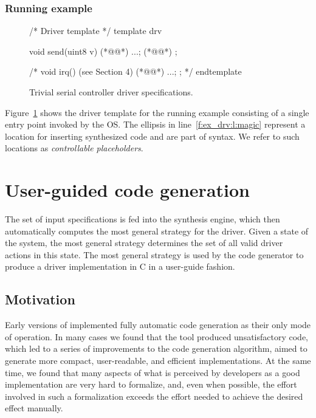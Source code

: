 \subsubsection{Running example}

\begin{figure}
\lstset{firstnumber=last}
\begin{tsllisting}[name=ex]
/* Driver template */
template drv 

    void send(uint8 v){ (*@\label{f:ex_drv:l:send}@*)
        ...; (*@\label{f:ex_drv:l:magic}@*)
    }; 

    /*
    void irq(){ (see Section 4) (*@\label{f:ex_drv:l:irq}@*)
        ...;
    }; 
    */
endtemplate
\end{tsllisting}
\caption{Trivial serial controller driver specifications.}
\label{f:ex_drv}
\end{figure}

Figure~\ref{f:ex_drv} shows the driver template for the running example consisting of a single  entry point invoked by the OS.  The ellipsis in line~\ref{f:ex_drv:l:magic} represent a location for inserting synthesized code and are part of \tsl syntax.  We refer to such locations as \emph{controllable placeholders}. 

\section{User-guided code generation}
\label{s:user-guided}

The set of input \tsl specifications is fed into the \termite synthesis engine, which then automatically computes the most general strategy for the driver.  Given a state of the system, the most general strategy determines the set of all valid driver actions in this state.  The most general strategy is used by the \termite code generator to produce a driver implementation in C in a user-guide fashion.

\subsection{Motivation}

Early versions of \termite implemented fully automatic code generation as their only mode of operation.  In many cases we found that the tool produced unsatisfactory code, which led to a series of improvements to the code generation algorithm, aimed to generate more compact, user-readable, and efficient implementations.  At the same time, we found that many aspects of what is perceived by developers as a good implementation are very hard to formalize, and, even when possible, the effort involved in such a formalization exceeds the effort needed to achieve the desired effect manually.

